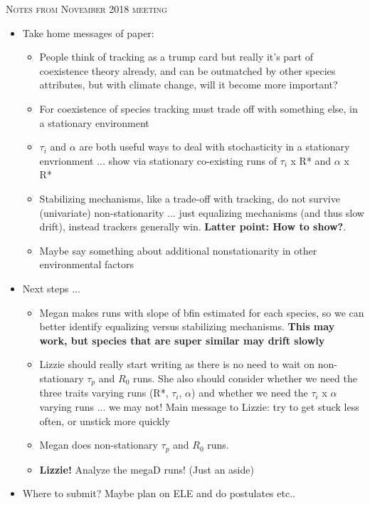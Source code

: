 \documentclass[11pt,letterpaper]{article}
\renewcommand{\section}[1]{%
\bigskip
\begin{center}
\begin{Large}
\normalfont\scshape #1
\medskip
\end{Large}
\end{center}}
\begin{document}
\section{Notes from November 2018 meeting}
\begin{itemize}
\item Take home messages of paper:
\begin{itemize}
\item People think of tracking as a trump card but really it’s part of coexistence theory already, and can be outmatched by other species attributes, but with climate change, will it become more important?
\item For coexistence of species tracking must trade off with something else, in a stationary environment 
\item $\tau_i$ and $\alpha$ are both useful ways to deal with stochasticity in a stationary envrionment ... show via stationary co-existing runs of $\tau_i$  x R* and $\alpha$ x R*
\item Stabilizing mechanisms, like a trade-off with tracking, do not survive (univariate) non-stationarity ... just equalizing mechanisms (and thus slow drift), instead trackers generally win.  {\bf Latter point: How to show?}. 
\item Maybe say something about additional nonstationarity in other environmental factors
\end{itemize}
\item Next steps ...
\begin{itemize}
\item Megan makes runs with slope of bfin estimated for each species, so we can better identify equalizing versus stabilizing mechanisms.  {\bf This may work, but species that are super similar may drift slowly}
\item Lizzie should really start writing as there is no need to wait on non-stationary $\tau_p$ and $R_{0}$ runs. She also should consider whether we need the three traits varying runs (R*, $\tau_i$, $\alpha$) and whether we need the $\tau_i$  x $\alpha$ varying runs ... we may not! Main message to Lizzie: try to get stuck less often, or unstick more quickly
\item Megan does non-stationary $\tau_p$ and $R_{0}$ runs.
\item {\bf Lizzie!} Analyze the megaD runs! (Just an aside)
\end{itemize}
\item Where to submit? Maybe plan on ELE and do postulates etc..
\end{itemize}
\end{document}
